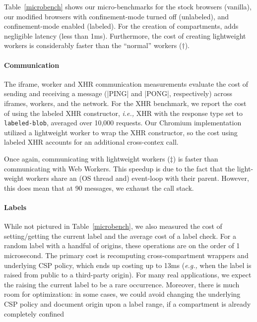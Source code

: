 Table~\ref{microbench} shows our micro-benchmarks for the stock
browsers (vanilla), our modified browsers with confinement-mode turned
off (unlabeled), and confinement-mode enabled (labeled).
%
For the creation of compartments, \sys{} adds negligible latency (less
than 1ms).
%
Furthermore, the cost of creating lightweight workers is considerably
faster than the ``normal'' workers ($\dagger$).

\paragraph{Communication} The iframe, worker and XHR communication measurements evaluate the
cost of sending and receiving a message (\js|PING| and \js|PONG|,
respectively) across iframes, workers, and the network.
%
For the XHR benchmark, we report the cost of using the labeled XHR
constructor, \emph{i.e.,} XHR with the response type set to
\verb|labeled-blob|, averaged over 10,000 requests.
%
Our Chromium implementation utilized a lightweight worker to wrap the XHR
constructor, so the cost using labeled XHR accounts for an additional
cross-contex call.

Once again, communicating with lightweight workers ($\ddagger$)
is
faster than communicating with Web Workers.
%
This speedup is due to the fact that the light-weight workers share
 an (OS thread and) event-loop with their parent.
%
However, this does mean that at 90 messages, we exhaust the call
stack.


\paragraph{Labels} While not pictured in Table~\ref{microbench},
we also measured the cost of setting/getting the current label and the
average cost of a label check.
%
For a random label with a handful of origins, these operations are on
the order of 1 microsecond.
%
The primary cost is recomputing cross-compartment wrappers and
underlying CSP policy, which ends up costing up to 13ms (\emph{e.g.,} when
the label is raised from public to a third-party origin).
%
For many real applications, we expect the raising the current label
to be a rare occurrence.
%
Moreover, there is much room for optimization: in some cases,
we could avoid changing the underlying CSP policy and document
origin upon a label range, if a compartment is already completely confined 
 
